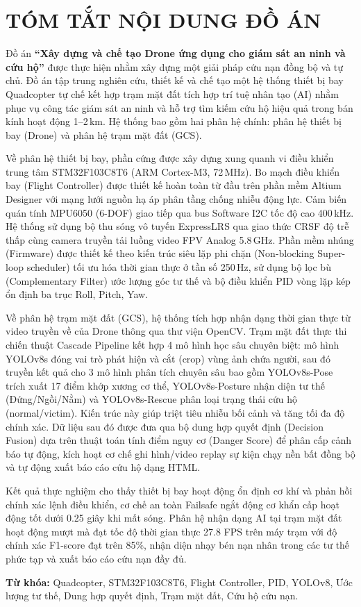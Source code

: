 \section*{TÓM TẮT NỘI DUNG ĐỒ ÁN}
\thispagestyle{empty}

Đồ án \textbf{``Xây dựng và chế tạo Drone ứng dụng cho giám sát an ninh và cứu hộ''} được thực hiện nhằm xây dựng một giải pháp cứu nạn đồng bộ và tự chủ. Đồ án tập trung nghiên cứu, thiết kế và chế tạo một hệ thống thiết bị bay Quadcopter tự chế kết hợp trạm mặt đất tích hợp trí tuệ nhân tạo (AI) nhằm phục vụ công tác giám sát an ninh và hỗ trợ tìm kiếm cứu hộ hiệu quả trong bán kính hoạt động 1--2\,km. Hệ thống bao gồm hai phân hệ chính: phân hệ thiết bị bay (Drone) và phân hệ trạm mặt đất (GCS).

Về phân hệ thiết bị bay, phần cứng được xây dựng xung quanh vi điều khiển trung tâm STM32F103C8T6 (ARM Cortex-M3, 72\,MHz). Bo mạch điều khiển bay (Flight Controller) được thiết kế hoàn toàn từ đầu trên phần mềm Altium Designer với mạng lưới nguồn hạ áp phân tầng chống nhiễu động lực. Cảm biến quán tính MPU6050 (6-DOF) giao tiếp qua bus Software I2C tốc độ cao 400\,kHz. Hệ thống sử dụng bộ thu sóng vô tuyến ExpressLRS qua giao thức CRSF độ trễ thấp cùng camera truyền tải luồng video FPV Analog 5.8\,GHz. Phần mềm nhúng (Firmware) được thiết kế theo kiến trúc siêu lặp phi chặn (Non-blocking Super-loop scheduler) tối ưu hóa thời gian thực ở tần số 250\,Hz, sử dụng bộ lọc bù (Complementary Filter) ước lượng góc tư thế và bộ điều khiển PID vòng lặp kép ổn định ba trục Roll, Pitch, Yaw.

Về phân hệ trạm mặt đất (GCS), hệ thống tích hợp nhận dạng thời gian thực từ video truyền về của Drone thông qua thư viện OpenCV. Trạm mặt đất thực thi chiến thuật Cascade Pipeline kết hợp 4 mô hình học sâu chuyên biệt: mô hình YOLOv8s đóng vai trò phát hiện và cắt (crop) vùng ảnh chứa người, sau đó truyền kết quả cho 3 mô hình phân tích chuyên sâu bao gồm YOLOv8s-Pose trích xuất 17 điểm khớp xương cơ thể, YOLOv8s-Posture nhận diện tư thế (Đứng/Ngồi/Nằm) và YOLOv8s-Rescue phân loại trạng thái cứu hộ (normal/victim). Kiến trúc này giúp triệt tiêu nhiễu bối cảnh và tăng tối đa độ chính xác. Dữ liệu sau đó được đưa qua bộ dung hợp quyết định (Decision Fusion) dựa trên thuật toán tính điểm nguy cơ (Danger Score) để phân cấp cảnh báo tự động, kích hoạt cơ chế ghi hình/video replay sự kiện chạy nền bất đồng bộ và tự động xuất báo cáo cứu hộ dạng HTML.

Kết quả thực nghiệm cho thấy thiết bị bay hoạt động ổn định cơ khí và phản hồi chính xác lệnh điều khiển, cơ chế an toàn Failsafe ngắt động cơ khẩn cấp hoạt động tốt dưới 0.25 giây khi mất sóng. Phân hệ nhận dạng AI tại trạm mặt đất hoạt động mượt mà đạt tốc độ thời gian thực 27.8 FPS trên máy trạm với độ chính xác F1-score đạt trên 85\%, nhận diện nhạy bén nạn nhân trong các tư thế phức tạp và xuất báo cáo cứu nạn đầy đủ.

\vspace{6pt}
\noindent\textbf{Từ khóa:} Quadcopter, STM32F103C8T6, Flight Controller, PID, YOLOv8, Ước lượng tư thế, Dung hợp quyết định, Trạm mặt đất, Cứu hộ cứu nạn.
\cleardoublepage

